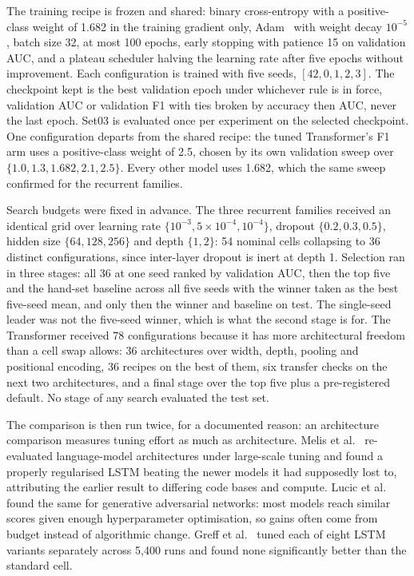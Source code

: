 \documentclass[mti,article,submit,moreauthors]{Definitions/mdpi}
\begin{document}
The training recipe is frozen and shared: binary cross-entropy with a positive-class weight of 1.682 in the training gradient only, Adam~\citep{kingma2015adam} with weight decay $10^{-5}$, batch size 32, at most 100 epochs, early stopping with patience 15 on validation AUC, and a plateau scheduler halving the learning rate after five epochs without improvement. Each configuration is trained with five seeds, $[42, 0, 1, 2, 3]$. The checkpoint kept is the best validation epoch under whichever rule is in force, validation AUC or validation F1 with ties broken by accuracy then AUC, never the last epoch. Set03 is evaluated once per experiment on the selected checkpoint. One configuration departs from the shared recipe: the tuned Transformer's F1 arm uses a positive-class weight of 2.5, chosen by its own validation sweep over $\{1.0, 1.3, 1.682, 2.1, 2.5\}$. Every other model uses 1.682, which the same sweep confirmed for the recurrent families.

Search budgets were fixed in advance. The three recurrent families received an identical grid over learning rate $\{10^{-3}, 5\times10^{-4}, 10^{-4}\}$, dropout $\{0.2, 0.3, 0.5\}$, hidden size $\{64, 128, 256\}$ and depth $\{1, 2\}$: 54 nominal cells collapsing to 36 distinct configurations, since inter-layer dropout is inert at depth 1. Selection ran in three stages: all 36 at one seed ranked by validation AUC, then the top five and the hand-set baseline across all five seeds with the winner taken as the best five-seed mean, and only then the winner and baseline on test. The single-seed leader was not the five-seed winner, which is what the second stage is for. The Transformer received 78 configurations because it has more architectural freedom than a cell swap allows: 36 architectures over width, depth, pooling and positional encoding, 36 recipes on the best of them, six transfer checks on the next two architectures, and a final stage over the top five plus a pre-registered default. No stage of any search evaluated the test set.

The comparison is then run twice, for a documented reason: an architecture comparison measures tuning effort as much as architecture. Melis et al.~\citep{melis2018sota} re-evaluated language-model architectures under large-scale tuning and found a properly regularised LSTM beating the newer models it had supposedly lost to, attributing the earlier result to differing code bases and compute. Lucic et al.~\citep{lucic2018gans} found the same for generative adversarial networks: most models reach similar scores given enough hyperparameter optimisation, so gains often come from budget instead of algorithmic change. Greff et al.~\citep{greff2017odyssey} tuned each of eight LSTM variants separately across 5,400 runs and found none significantly better than the standard cell.
\end{document}

